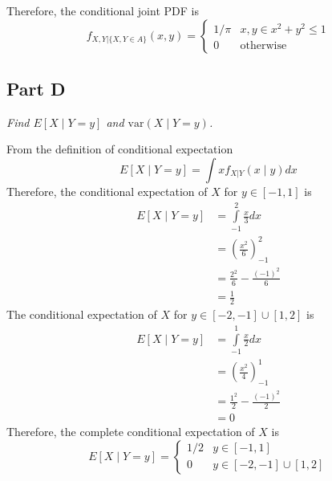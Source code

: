 \documentclass{article}
\begin{document}
Therefore, the conditional joint PDF is
$$ f_{X,Y|\{X,Y \in A\}}(x, y) = \begin{cases}
    1/\pi & x, y \in x^2 + y^2 \leq 1 \\
    0 & \mathrm{otherwise}
\end{cases} $$

\subsection*{Part D}

\textit{Find $E[X \mid Y = y]$ and $\mathrm{var}(X \mid Y = y)$.}

\bigbreak

From the definition of conditional expectation
$$ E[X \mid Y = y] = \int x f_{X|Y}(x \mid y) dx $$
Therefore, the conditional expectation of $X$ for $y \in [-1, 1]$ is
\begin{align*}
    E[X \mid Y = y] &= \int\limits_{-1}^2 \frac{x}{3} dx \\
    &= \left( \frac{x^2}{6} \right)_{-1}^2 \\
    &= \frac{2^2}{6} - \frac{(-1)^2}{6} \\
    &= \frac{1}{2}
\end{align*}
The conditional expectation of $X$ for $y \in [-2, -1] \cup [1, 2]$ is
\begin{align*}
    E[X \mid Y = y] &= \int\limits_{-1}^1 \frac{x}{2} dx \\
    &= \left( \frac{x^2}{4} \right)_{-1}^1 \\
    &= \frac{1^2}{2} - \frac{(-1)^2}{2} \\
    &= 0
\end{align*}
Therefore, the complete conditional expectation of $X$ is
$$ E[X \mid Y = y] = \begin{cases}
    1/2 & y \in [-1, 1] \\
    0 & y \in [-2, -1] \cup [1, 2]
\end{cases} $$
\end{document}
